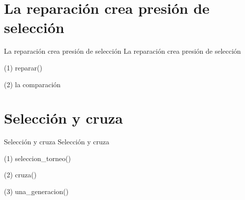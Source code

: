 \section{La reparación crea presión de selección}

\begin{frame}{La reparación crea presión de selección}
La reparación crea presión de selección
\end{frame}

\begin{frame}[fragile]{(1) reparar()}

\end{frame}

\begin{frame}[fragile]{(2) la comparación}

\end{frame}


\section{Selección y cruza}

\begin{frame}{Selección y cruza}
Selección y cruza
\end{frame}

\begin{frame}[fragile]{(1) seleccion\_torneo()}

\end{frame}

\begin{frame}[fragile]{(2) cruza()}

\end{frame}

\begin{frame}[fragile]{(3) una\_generacion()}

\end{frame}

